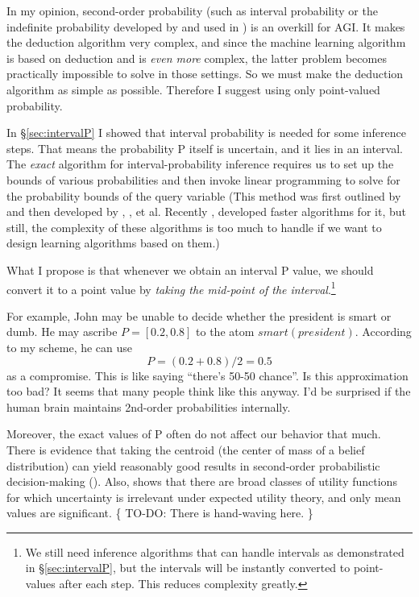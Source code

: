 In my opinion, second-order probability (such as interval probability or the indefinite probability developed by \citep*{Walley1991} and used in \citep*{Goertzel2008}) is an overkill for AGI.  It makes the deduction algorithm very complex, and since the machine learning algorithm is based on deduction and is \textit{even more} complex, the latter problem becomes practically impossible to solve in those settings.  So we must make the deduction algorithm as simple as possible.  Therefore I suggest using only point-valued probability.

In \S\ref{sec:intervalP} I showed that interval probability is needed for some inference steps.  That means the probability P itself is uncertain, and it lies in an interval.  The \emph{exact} algorithm for interval-probability inference requires us to set up the bounds of various probabilities and then invoke linear programming to solve for the probability bounds of the query variable (This method was first outlined by \citep*{Boole1854} and then developed by \citep*{Hailperin1965}, \citep*{Nilsson1986}, \citep*{Ng1992} et al. Recently \citep*{Hansen2000}, \citep*{Jaumard2006} developed faster algorithms for it, but still, the complexity of these algorithms is too much to handle if we want to design learning algorithms based on them.)

What I propose is that whenever we obtain an interval P value, we should convert it to a point value by \emph{taking the mid-point of the interval}.\footnote{We still need inference algorithms that can handle intervals as demonstrated in \S\ref{sec:intervalP}, but the intervals will be instantly converted to point-values after each step. This reduces complexity greatly.}

For example, John may be unable to decide whether the president is smart or dumb.  He may ascribe $P = [0.2,0.8]$ to the atom $smart(president)$.  According to my scheme, he can use \[ P = (0.2 + 0.8) / 2 = 0.5 \] as a compromise.  This is like saying ``there's 50-50 chance''.  Is this approximation too bad?  It seems that many people think like this anyway.  I'd be surprised if the human brain maintains 2nd-order probabilities internally.

Moreover, the exact values of P often do not affect our behavior that much.  There is evidence that taking the centroid (the center of mass of a belief distribution) can yield reasonably good results in second-order probabilistic decision-making (\citep*{Sundgren2006}).  Also, \citep*{Bier1993} shows that there are broad classes of utility functions for which uncertainty is irrelevant under expected utility theory, and only mean values are significant.  \{ TO-DO:  There is hand-waving here. \}

